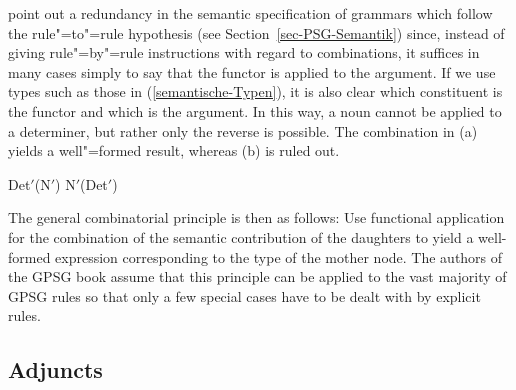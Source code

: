 \largerpage[2]
\citet*[]{GKPS85a} point out a redundancy in the semantic specification of grammars which follow the rule"=to"=rule
hypothesis (see Section~\ref{sec-PSG-Semantik}) since, instead of giving rule"=by"=rule instructions with regard to combinations, it suffices in many cases simply
to say that the functor is applied to the argument. If we use types such as those in (\ref{semantische-Typen}), it is also clear which constituent is the functor
and which is the argument. In this way, a noun cannot be applied to a determiner, but rather only the reverse is possible. The combination in (a) yields a
well"=formed result, whereas (b) is ruled out.

\begin{samepage}
\eal
\ex Det$'$(N$'$)
\ex N$'$(Det$'$)
\zl
\end{samepage}

\noindent
The general combinatorial principle is then as follows:
\eanoraggedright
Use functional application for the combination of the semantic contribution of the daughters to yield a well-formed expression corresponding to the
type of the mother node.
\z
The authors of the GPSG book assume that this principle can be applied to the vast majority of GPSG rules so that only a few special cases have to be dealt
with by explicit rules.

\subsection{Adjuncts}
\label{Abschnitt-Adjunkte-GPSG}

